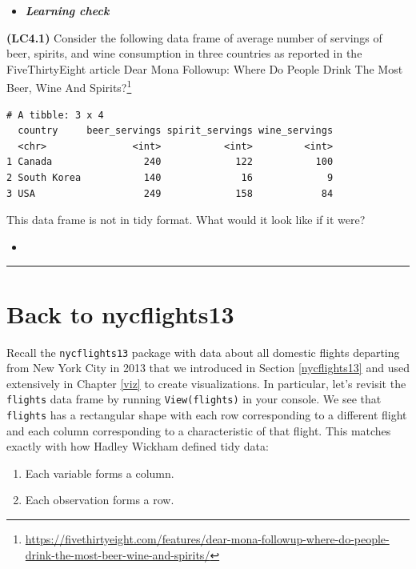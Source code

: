 \documentclass[12pt,]{krantz}
\providecommand{\tightlist}{%
  \setlength{\itemsep}{0pt}\setlength{\parskip}{0pt}}
\renewcommand{\href}[2]{#2\footnote{\url{#1}}}
\newenvironment{rmdblock}[1]
  {\begin{shaded*}
  \begin{itemize}
  \renewcommand{\labelitemi}{
    \raisebox{-.7\height}[0pt][0pt]{
    }
  }
  \item
  }
  {
  \end{itemize}
  \end{shaded*}
  }
\newenvironment{learncheck}
  {\begin{rmdblock}{warning}}
  {\end{rmdblock}}
\theoremstyle{definition}
\theoremstyle{definition}
\theoremstyle{definition}
\theoremstyle{remark}
\begin{document}
\begin{learncheck}
\textbf{\emph{Learning check}}
\end{learncheck}

\textbf{(LC4.1)} Consider the following data frame of average number of
servings of beer, spirits, and wine consumption in three countries as
reported in the FiveThirtyEight article
\href{https://fivethirtyeight.com/features/dear-mona-followup-where-do-people-drink-the-most-beer-wine-and-spirits/}{Dear
Mona Followup: Where Do People Drink The Most Beer, Wine And Spirits?}

\begin{verbatim}
# A tibble: 3 x 4
  country     beer_servings spirit_servings wine_servings
  <chr>               <int>           <int>         <int>
1 Canada                240             122           100
2 South Korea           140              16             9
3 USA                   249             158            84
\end{verbatim}

This data frame is not in tidy format. What would it look like if it
were?

\begin{learncheck}

\end{learncheck}

\begin{center}\rule{0.5\linewidth}{\linethickness}\end{center}

\section{Back to nycflights13}\label{back-to-nycflights13}

Recall the \texttt{nycflights13} package with data about all domestic
flights departing from New York City in 2013 that we introduced in
Section \ref{nycflights13} and used extensively in Chapter \ref{viz} to
create visualizations. In particular, let's revisit the \texttt{flights}
data frame by running \texttt{View(flights)} in your console. We see
that \texttt{flights} has a rectangular shape with each row
corresponding to a different flight and each column corresponding to a
characteristic of that flight. This matches exactly with how Hadley
Wickham defined tidy data:

\begin{enumerate}
\def\labelenumi{\arabic{enumi}.}
\tightlist
\item
  Each variable forms a column.
\item
  Each observation forms a row.
\end{enumerate}
\end{document}

